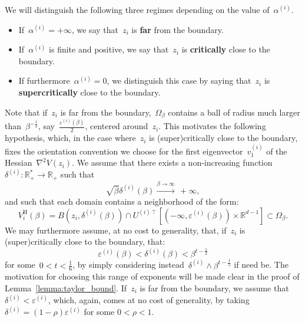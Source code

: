 \documentclass[10pt]{article}
\newcommand{\R}{\mathbb{R}}
\newcommand{\1}{\mathbbm 1}
\newcommand{\epsBoundary}[1]{\varepsilon^{(#1)}} %
\newcommand{\deltaRadius}[1]{\delta^{(#1)}} %
\newcommand{\epsLimit}[1]{\alpha^{(#1)}} %
\newcommand{\scalingExp}{t}
\newcommand{\shift}{\rho} %
\newcommand{\deltai}{\delta^{(i)}}
\begin{document}
    We will distinguish the following three regimes depending on the value of~$\epsLimit{i}$.
    \begin{itemize}
        \item If~$\epsLimit{i}= +\infty$, we say that~$z_i$ is {\bf far} from the boundary.
        \item If~$\epsLimit{i}$ is finite and positive, we say that~$z_i$ is {\bf critically} close to the boundary.
        \item If furthermore~$\epsLimit{i}=0$, we distinguish this case by saying that~$z_i$ is {\bf supercritically} close to the boundary.
    \end{itemize}
    Note that if~$z_i$ is far from the boundary,~$\Omega_\beta$ contains a ball of radius much larger than~$\beta^{-\frac12}$, say~$\frac{\epsBoundary{i}(\beta)}2$, centered around~$z_i$.
    This motivates the following hypothesis, which, in the case where~$z_i$ is (super)critically close to the boundary, fixes the orientation convention we choose for the first eigenvector~$v_1^{(i)}$ of the Hessian~$\nabla^2 V(z_i)$.
    We assume that there exists a non-increasing function~$\deltai :\R_+^*\to\R_+$ such that
    \begin{equation}
        \label{eq:supercritical_scaling_delta}
        \sqrt\beta\deltaRadius{i}(\beta)\overset{\beta\to\infty}{\longrightarrow}\,+\infty,
    \end{equation}
    and such that each domain contains a neighborhood of the form:
    \begin{equation}
        \label{eq:capped_ball_neighborhood}
        V_i^{\mathrm H}(\beta) = B(z_i,\deltaRadius{i}(\beta)) \cap U^{(i)\intercal}\left[(-\infty,\epsBoundary{i}(\beta))\times \R^{d-1}\right] \subset \Omega_\beta.
    \end{equation}
    We may furthermore assume, at no cost to generality, that, if~$z_i$ is (super)critically close to the boundary, that:
    \begin{equation}
        \label{eq:deltai_polybound}
        \epsBoundary{i}(\beta)<\deltaRadius{i}(\beta) < \beta^{\scalingExp-\frac12}
    \end{equation}
    for some~$0<\scalingExp<\frac16$, by simply considering instead~$\deltaRadius{i} \land \beta^{\scalingExp-\frac12}$ if need be.
    The motivation for choosing this range of exponents will be made clear in the proof of Lemma~\ref{lemma:taylor_bound}. 
    If~$z_i$ is far from the boundary, we assume that~$\deltaRadius{i}<\epsBoundary{i}$, which, again, comes at no cost of generality, by taking~$\deltaRadius{i} = (1-\shift)\epsBoundary{i}$ for some $0<\shift<1$.
\end{document}

